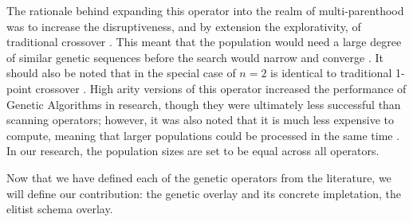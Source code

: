 The rationale behind expanding this operator into the realm of multi-parenthood was to increase the disruptiveness, and by extension the explorativity, of traditional crossover \cite{Eiben97}. This meant that the population would need a large degree of similar genetic sequences before the search would narrow and converge \cite{Eiben95}. It should also be noted that in the special case of $n = 2$ is identical to traditional 1-point crossover \cite{Eiben95}. High arity versions of this operator increased the performance of Genetic Algorithms in research, though they were ultimately less successful than scanning operators; however, it was also noted that it is much less expensive to compute, meaning that larger populations could be processed in the same time \cite{Eiben95}. In our research, the population sizes are set to be equal across all operators.

Now that we have defined each of the genetic operators from the literature, we will define our contribution: the genetic overlay and its concrete impletation, the elitist schema overlay.
